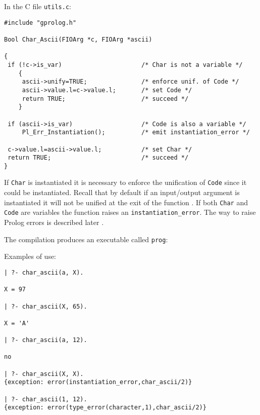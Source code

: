 
In the C file \texttt{utils.c}:

\begin{Indentation}
\begin{verbatim}
#include "gprolog.h"

Bool Char_Ascii(FIOArg *c, FIOArg *ascii)

{
 if (!c->is_var)                      /* Char is not a variable */
    {
     ascii->unify=TRUE;               /* enforce unif. of Code */
     ascii->value.l=c->value.l;       /* set Code */
     return TRUE;                     /* succeed */
    }

 if (ascii->is_var)                   /* Code is also a variable */
     Pl_Err_Instantiation();          /* emit instantiation_error */

 c->value.l=ascii->value.l;           /* set Char */
 return TRUE;                         /* succeed */
}
\end{verbatim}
\end{Indentation}

If \texttt{Char} is instantiated it is necessary to enforce the unification
of \texttt{Code} since it could be instantiated. Recall that by default if
an input/output argument is instantiated it will not be unified at the exit
of the function . If both \texttt{Char} and
\texttt{Code} are variables the function raises an
\texttt{instantiation\_error}. The way to raise Prolog errors is described
later .

The compilation produces an executable called \texttt{prog}:


Examples of use:

\begin{Indentation}
\begin{verbatim}
| ?- char_ascii(a, X).

X = 97

| ?- char_ascii(X, 65).

X = 'A'

| ?- char_ascii(a, 12).

no

| ?- char_ascii(X, X).
{exception: error(instantiation_error,char_ascii/2)}

| ?- char_ascii(1, 12).
{exception: error(type_error(character,1),char_ascii/2)}
\end{verbatim}
\end{Indentation}

